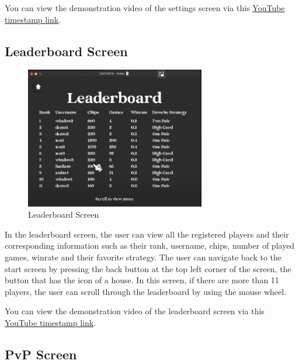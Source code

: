 \hspace{1cm} You can view the demonstration video of the settings screen via this \href{https://youtu.be/OA0v6xG21N4?t=144}{YouTube timestamp link}.

\subsection{Leaderboard Screen}
\label{subsec:leaderboard-screen}

\begin{figure}[H]
    \centering
    \includegraphics[width=0.7\textwidth]{figures/leaderboard_screen.png}
    \caption{Leaderboard Screen}
    \label{fig:leaderboard-screen}
\end{figure}

\hspace{1cm} In the leaderboard screen, the user can view all the registered players and their corresponding information such as their rank, username, chips, number of played games, winrate and their favorite strategy. The user can navigate back to the start screen by pressing the back button at the top left corner of the screen, the button that has the icon of a house. In this screen, if there are more than 11 players, the user can scroll through the leaderboard by using the mouse wheel.

\vspace{0.5cm}

\hspace{1cm} You can view the demonstration video of the leaderboard screen via this \href{https://youtu.be/OA0v6xG21N4?t=302}{YouTube timestamp link}.

\subsection{PvP Screen}
\label{subsec:pvp-screen}

